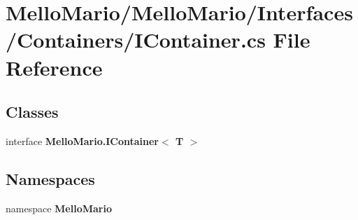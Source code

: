 \section{Mello\+Mario/\+Mello\+Mario/\+Interfaces/\+Containers/\+I\+Container.cs File Reference}
\label{IContainer_8cs}
\subsection*{Classes}
\begin{DoxyCompactItemize}
\item 
interface \textbf{ Mello\+Mario.\+I\+Container$<$ T $>$}
\end{DoxyCompactItemize}
\subsection*{Namespaces}
\begin{DoxyCompactItemize}
\item 
namespace \textbf{ Mello\+Mario}
\end{DoxyCompactItemize}
